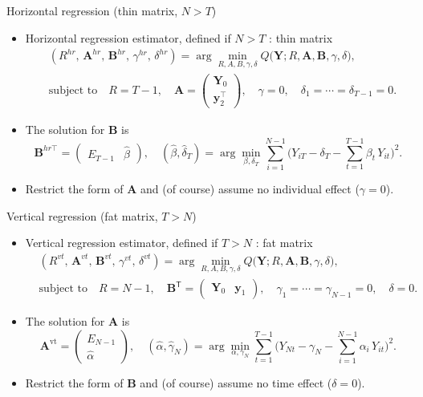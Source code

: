 \documentclass[xcolor=svgnames,aspectratio=169]{beamer}
\begin{document}
\begin{frame}{Horizontal regression (thin matrix, $N>T$)}
  \begin{itemize}
    \item Horizontal regression estimator, defined if $N>T$ : thin matrix
      \begin{align*}
        &(R^{hr},\,\mathbf{A}^{hr},\,\mathbf{B}^{hr},\,\gamma^{hr},\,\delta^{hr})
        = \arg\min_{R,A,B,\gamma,\delta}
           Q\bigl(\mathbf{Y};R,\mathbf{A},\mathbf{B},\gamma,\delta\bigr),\\
        &\text{subject to}\quad
        R = T-1,\quad
        \mathbf{A} = \begin{pmatrix}\mathbf{Y}_0 \\ \mathbf{y}_2^\top\end{pmatrix},\quad
        \gamma = 0,\quad
        \delta_1 = \cdots = \delta_{T-1} = 0.
      \end{align*}
    \item The solution for $\mathbf{B}$ is
    \[
      \mathbf{B}^{hr\top}
      = \begin{pmatrix} E_{T-1} & \hat\beta \end{pmatrix},
      \quad
      (\hat\beta,\hat\delta_T)
      = \arg\min_{\beta,\delta_T}
        \sum_{i=1}^{N-1}
        \bigl(Y_{iT} - \delta_T - \sum_{t=1}^{T-1}\beta_t\,Y_{it}\bigr)^2.
    \]
    \item Restrict the form of $\mathbf{A}$ and (of course) assume no individual effect ($\gamma=0$).
  \end{itemize}
\end{frame}


\begin{frame}{Vertical regression (fat matrix, $T>N$)}
    \begin{itemize}
        \item Vertical regression estimator, defined if $T>N$ : fat matrix
      \begin{align*}
        &(R^{vt},\,\mathbf{A}^{vt},\,\mathbf{B}^{vt},\,\gamma^{vt},\,\delta^{vt})
        = \arg\min_{R,A,B,\gamma,\delta}
           Q\bigl(\mathbf{Y};R,\mathbf{A},\mathbf{B},\gamma,\delta\bigr),\\
        &\text{subject to}\quad
        R = N-1,\quad
        \mathbf{B}^{\mathsf{T}} = \begin{pmatrix}\mathbf{Y}_0 & \mathbf{y}_1\end{pmatrix},\quad
        \gamma_1 = \cdots = \gamma_{N-1} =0 ,\quad
        \delta= 0.
      \end{align*}
      \item The solution for $\mathbf{A}$ is
    \[
      \mathbf{A}^{\text{vt}}
      = \begin{pmatrix} E_{N-1} \\ \hat\alpha \end{pmatrix},
      \quad
      (\hat\alpha,\hat\gamma_N)
      = \arg\min_{\alpha,\gamma_N}
        \sum_{t=1}^{T-1}
        \bigl(Y_{Nt} - \gamma_N - \sum_{i=1}^{N-1}\alpha_i\,Y_{it}\bigr)^2.
    \]
    \item Restrict the form of $\mathbf{B}$ and (of course) assume no time effect ($\delta=0$).
    \end{itemize}
\end{frame}
\end{document}
